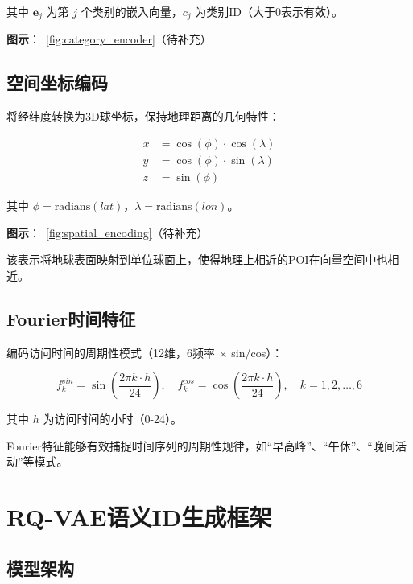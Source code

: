 其中 $\mathbf{e}_j$ 为第 $j$ 个类别的嵌入向量，$c_j$ 为类别ID（大于0表示有效）。

\textbf{图示}：\figurename~\ref{fig:category_encoder}（待补充）

\subsection{空间坐标编码}
\label{sec:spatial_encoder}

将经纬度转换为3D球坐标，保持地理距离的几何特性：

\begin{equation}
\begin{aligned}
x &= \cos(\phi) \cdot \cos(\lambda) \\
y &= \cos(\phi) \cdot \sin(\lambda) \\
z &= \sin(\phi)
\end{aligned}
\label{eq:3d_sphere}
\end{equation}

其中 $\phi = \text{radians}(lat)$，$\lambda = \text{radians}(lon)$。

\textbf{图示}：\figurename~\ref{fig:spatial_encoding}（待补充）

该表示将地球表面映射到单位球面上，使得地理上相近的POI在向量空间中也相近。

\subsection{Fourier时间特征}
\label{sec:fourier_time}

编码访问时间的周期性模式（12维，6频率 $\times$ sin/cos）：

\begin{equation}
f_k^{sin} = \sin\left(\frac{2\pi k \cdot h}{24}\right), \quad
f_k^{cos} = \cos\left(\frac{2\pi k \cdot h}{24}\right), \quad k = 1, 2, \dots, 6
\label{eq:fourier_time}
\end{equation}

其中 $h$ 为访问时间的小时（0-24）。

Fourier特征能够有效捕捉时间序列的周期性规律，如``早高峰''、``午休''、``晚间活动''等模式。

\section{RQ-VAE语义ID生成框架}
\label{sec:rqvae_framework}

\subsection{模型架构}
\label{sec:rqvae_arch}

